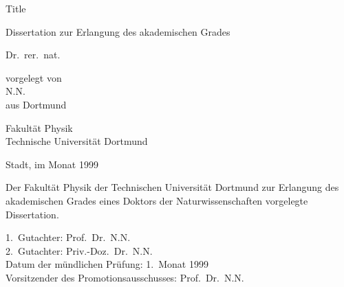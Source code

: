 
\begin{titlepage}

\vspace*{20ex}
{%
\Huge \sffamily \bfseries 
\begin{center}
Title
\end{center} 
}%

\begin{otherlanguage}{german}
{%
\LARGE \sffamily %
\begin{center}
Dissertation zur Erlangung des akademischen Grades\\
\end{center}
}

{%
\LARGE \sffamily %
\begin{center}
Dr.~rer.~nat.
\end{center}
}

\vspace{5ex}


{%
\Large \rmfamily
\begin{center}
vorgelegt von \\[0.8ex]
N.N. \\[0.8ex]
aus Dortmund
\end{center}
}
\vspace{5ex}
{%
\Large \rmfamily
\begin{center}
Fakultät Physik\\
Technische Universität Dortmund
\end{center}
}
\vspace{4ex}
{%
\Large \rmfamily
\begin{center}
Stadt, im Monat 1999
\end{center}
}

\clearpage
\thispagestyle{empty}
\vspace*{\fill}
\noindent Der Fakultät Physik der Technischen Universität Dortmund zur Erlangung
des akademischen Grades eines Doktors der Naturwissenschaften vorgelegte
Dissertation.\\

\parbox{\textwidth}{
  1.~Gutachter: Prof.~Dr.~N.N. \\
  2.~Gutachter: Priv.-Doz.~Dr.~N.N.\\
  Datum der mündlichen Prüfung: 1.~Monat 1999\\
  Vorsitzender des Promotionsausschusses: Prof.~Dr.~N.N.
}
\end{otherlanguage}
\end{titlepage}
\setcounter{page}{1}